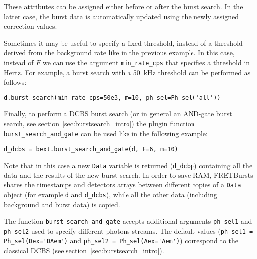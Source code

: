 These attributes can be assigned either before or after the burst search. In the
latter case, the burst data is
automatically updated using the newly assigned correction values.

Sometimes it may be useful to specify a fixed threshold, instead 
of a threshold derived from the background rate like in the previous example. In
this case, instead of $F$ we can use the argument \verb|min_rate_cps| that
specifies a threshold in Hertz. For example, a burst search with a 50~kHz
threshold can be performed as follows:

\begin{verbatim}
d.burst_search(min_rate_cps=50e3, m=10, ph_sel=Ph_sel('all'))
\end{verbatim}

Finally, to perform a DCBS burst search (or in general an AND-gate burst search,
see section~\ref{sec:burstsearch_intro}) the plugin function 
\href{http://fretbursts.readthedocs.org/en/latest/plugins.html#fretbursts.burstlib\_ext.burst\_search\_and\_gate}{\texttt{burst\_search\_and\_gate}}
can be used like in the following example:

\begin{verbatim}
d_dcbs = bext.burst_search_and_gate(d, F=6, m=10)
\end{verbatim}

Note that in this case a new \verb|Data| variable is returned (\verb|d_dcbp|)
containing all the data and the results of the new burst search. In order to
save RAM, FRETBursts shares the timestamps and detectors arrays between
different copies of a \verb|Data| object (for example \verb|d| and
\verb|d_dcbs|), while all the other data (including background and burst data)
is copied. 

The function \verb|burst_search_and_gate| accepts additional arguments
\verb|ph_sel1| and \verb|ph_sel2| 
used to specify different photons streams. The default values 
(\verb|ph_sel1 = Ph_sel(Dex='DAem')| and \verb|ph_sel2 = Ph_sel(Aex='Aem')|)
correspond to the classical DCBS 
(see section~\ref{sec:burstsearch_intro}).


